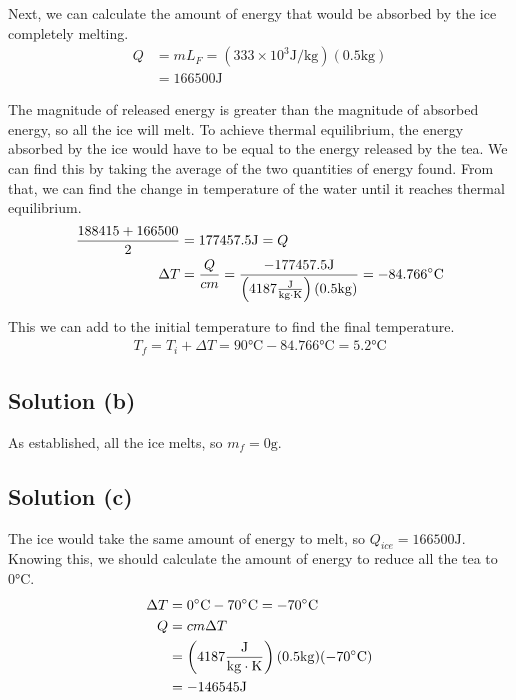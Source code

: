 \documentclass[12pt]{article}
\begin{document}
            Next, we can calculate the amount of energy that would be absorbed by the ice completely melting.
            \begin{align}
                Q   &=  m L_F
                    =   \left( 333 \times 10^3 \unit{\joule/\kilo\gram} \right) \left( 0.5 \unit{\kilo\gram} \right)\\
                    &=  166500 \unit{\joule}
            \end{align}

            The magnitude of released energy is greater than the magnitude of absorbed energy, so all the ice will melt.
            To achieve thermal equilibrium, the energy absorbed by the ice would have to be equal to the energy released by the tea.
            We can find this by taking the average of the two quantities of energy found.
            From that, we can find the change in temperature of the water until it reaches thermal equilibrium.
            \begin{align}
                \frac{188415 + 166500}{2}   &=  177457.5\unit{\joule}   =   Q\\
                \Delta T    &=  \frac{Q}{cm}
                    =   \frac{-177457.5\unit{\joule}}{\left( 4187 \unit{\frac{\joule}{\kilo\gram\cdot\kelvin}} \right) (0.5 \unit{\kilo\gram})}
                    =   -84.766 \unit{\celsius}
            \end{align}

            This we can add to the initial temperature to find the final temperature.
            \begin{gather}
                T_f = T_i + \Delta T = 90 \unit{\celsius} - 84.766 \unit{\celsius} = \boxed{5.2 \unit{\celsius}}
            \end{gather}

        \subsection{Solution (b)}
            As established, all the ice melts, so $m_f = \boxed{0\unit{\gram}}$. 

        \subsection{Solution (c)}
            The ice would take the same amount of energy to melt, so $Q_{ice} = 166500 \unit{\joule}$.
            Knowing this, we should calculate the amount of energy to reduce all the tea to $0\unit{\celsius}$. 
            \begin{align}
                \Delta T    &=  0 \unit{\celsius} - 70 \unit{\celsius} = -70 \unit{\celsius}\\
                Q   &=  cm\Delta T\\
                    &=  \left( 4187 \unit{\frac{\joule}{\kilo\gram\cdot\kelvin}} \right) (0.5 \unit{\kilo\gram}) (-70 \unit{\celsius})\\
                    &=  -146545 \unit{\joule}
            \end{align}
\end{document}
